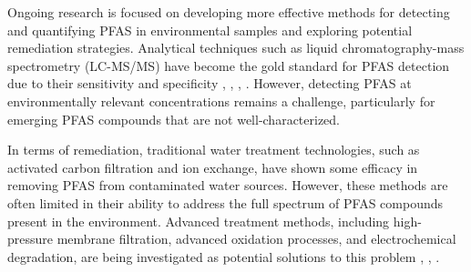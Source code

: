 Ongoing research is focused on developing more effective methods for detecting and quantifying PFAS in environmental samples and exploring potential remediation strategies. Analytical techniques such as liquid chromatography-mass spectrometry (LC-MS/MS) have become the gold standard for PFAS detection due to their sensitivity and specificity \cite{PFAS_detection_1}, \cite{PFAS_detection_2}, \cite{PFAS_detection_3}, \cite{PFAS_detection_4}. However, detecting PFAS at environmentally relevant concentrations remains a challenge, particularly for emerging PFAS compounds that are not well-characterized.

In terms of remediation, traditional water treatment technologies, such as activated carbon filtration and ion exchange, have shown some efficacy in removing PFAS from contaminated water sources. However, these methods are often limited in their ability to address the full spectrum of PFAS compounds present in the environment. Advanced treatment methods, including high-pressure membrane filtration, advanced oxidation processes, and electrochemical degradation, are being investigated as potential solutions to this problem \cite{PFAS_membrane_filtration}, \cite{PFAS_oxidation_1}, \cite{PFAS_oxidation_2}.

